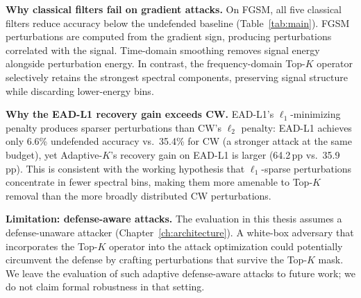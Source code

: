 \textbf{Why classical filters fail on gradient attacks.}
On FGSM, all five classical filters reduce accuracy below the undefended
baseline (Table~\ref{tab:main}). FGSM perturbations are computed from the
gradient sign, producing perturbations correlated with the signal.
Time-domain smoothing removes signal energy alongside perturbation energy.
In contrast, the frequency-domain Top-$K$ operator selectively retains
the strongest spectral components, preserving signal structure while
discarding lower-energy bins.

\textbf{Why the EAD-L1 recovery gain exceeds CW.}
EAD-L1's $\ell_1$-minimizing penalty produces sparser perturbations than
CW's $\ell_2$ penalty: EAD-L1 achieves only 6.6\% undefended accuracy
vs.\ 35.4\% for CW (a stronger attack at the same budget), yet
Adaptive-$K$'s recovery gain on EAD-L1 is larger (64.2\,pp vs.\
35.9\,pp). This is consistent with the working hypothesis that
$\ell_1$-sparse perturbations concentrate in fewer spectral bins, making
them more amenable to Top-$K$ removal than the more broadly distributed
CW perturbations.

\textbf{Limitation: defense-aware attacks.}
The evaluation in this thesis assumes a defense-unaware attacker
(Chapter~\ref{ch:architecture}). A white-box adversary that incorporates
the Top-$K$ operator into the attack optimization could potentially
circumvent the defense by crafting perturbations that survive the Top-$K$
mask. We leave the evaluation of such adaptive defense-aware attacks to
future work; we do not claim formal robustness in that setting.

